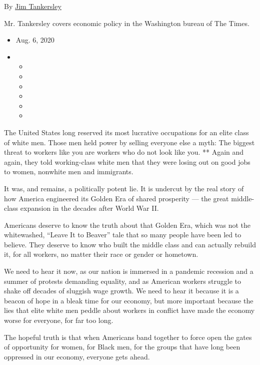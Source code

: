 By \href{https://www.nytimes3xbfgragh.onion/by/jim-tankersley}{Jim
Tankersley}

Mr. Tankersley covers economic policy in the Washington bureau of The
Times.

\begin{itemize}
\item
  Aug. 6, 2020
\item
  \begin{itemize}
  \item
  \item
  \item
  \item
  \item
  \item
  \end{itemize}
\end{itemize}

The United States long reserved its most lucrative occupations for an
elite class of white men. Those men held power by selling everyone else
a myth: The biggest threat to workers like you are workers who do not
look like you. ** Again and again, they told working-class white men
that they were losing out on good jobs to women, nonwhite men and
immigrants.

It was, and remains, a politically potent lie. It is undercut by the
real story of how America engineered its Golden Era of shared prosperity
--- the great middle-class expansion in the decades after World War II.

Americans deserve to know the truth about that Golden Era, which was not
the whitewashed, ``Leave It to Beaver'' tale that so many people have
been led to believe. They deserve to know who built the middle class and
can actually rebuild it, for all workers, no matter their race or gender
or hometown.

We need to hear it now, as our nation is immersed in a pandemic
recession and a summer of protests demanding equality, and as American
workers struggle to shake off decades of sluggish wage growth. We need
to hear it because it is a beacon of hope in a bleak time for our
economy, but more important because the lies that elite white men peddle
about workers in conflict have made the economy worse for everyone, for
far too long.

The hopeful truth is that when Americans band together to force open the
gates of opportunity for women, for Black men, for the groups that have
long been oppressed in our economy, everyone gets ahead.

